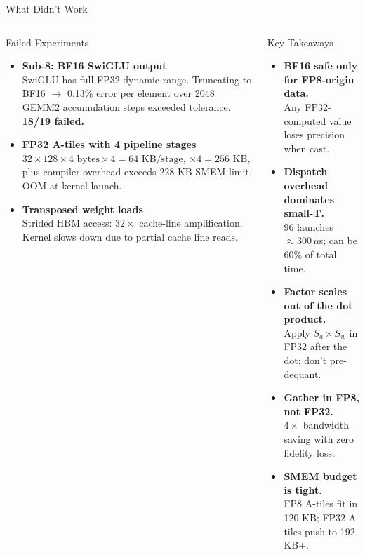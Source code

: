 \begin{frame}{What Didn't Work}
\begin{columns}[T]
\begin{alertblock}{Failed Experiments}
\small
\begin{itemize}
  \item \textbf{Sub-8: BF16 SwiGLU output}\\[2pt]
    SwiGLU has full FP32 dynamic range. Truncating to BF16
    $\to$ 0.13\% error per element over 2048 GEMM2 accumulation
    steps exceeded tolerance. \textbf{18/19 failed.}

  \medskip
  \item \textbf{FP32 A-tiles with 4 pipeline stages}\\[2pt]
    $32\times128\times4 \text{ bytes} \times 4 = 64\text{ KB/stage}$,
    $\times4 = 256\text{ KB}$, plus compiler overhead exceeds
    228 KB SMEM limit. OOM at kernel launch.

  \medskip
  \item \textbf{Transposed weight loads}\\[2pt]
    Strided HBM access: $32\times$ cache-line amplification.
    Kernel slows down due to partial cache line reads.
\end{itemize}
\end{alertblock}

\begin{block}{Key Takeaways}
\small
\begin{itemize}
  \item \textbf{BF16 safe only for FP8-origin data.}\\
    Any FP32-computed value loses precision when cast.

  \medskip
  \item \textbf{Dispatch overhead dominates small-T.}\\
    96 launches $\approx 300\,\mu$s; can be 60\% of total time.

  \medskip
  \item \textbf{Factor scales out of the dot product.}\\
    Apply $S_a \times S_w$ in FP32 after the dot; don't pre-dequant.

  \medskip
  \item \textbf{Gather in FP8, not FP32.}\\
    $4\times$ bandwidth saving with zero fidelity loss.

  \medskip
  \item \textbf{SMEM budget is tight.}\\
    FP8 A-tiles fit in 120 KB; FP32 A-tiles push to 192 KB+.
\end{itemize}
\end{block}
\end{columns}
\end{frame}

